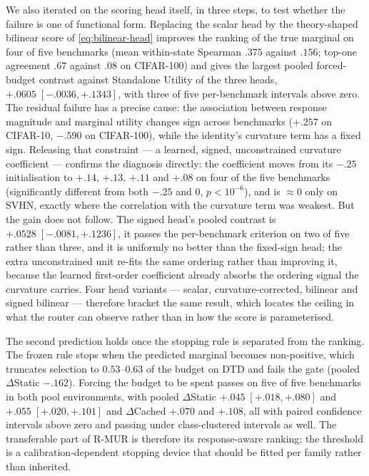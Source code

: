 We also iterated on the scoring head itself, in three steps, to test whether
the failure is one of functional form. Replacing the scalar head by the
theory-shaped bilinear score of \cref{eq:bilinear-head} improves the ranking of
the true marginal on four of five benchmarks (mean within-state Spearman $.375$
against $.156$; top-one agreement $.67$ against $.08$ on CIFAR-100) and gives
the largest pooled forced-budget contrast against Standalone Utility of the
three heads, $+.0605\;[-.0036,+.1343]$, with three of five per-benchmark
intervals above zero. The residual failure has a precise cause: the association
between response magnitude and marginal utility changes sign across benchmarks
($+.257$ on CIFAR-10, $-.590$ on CIFAR-100), while the identity's curvature term
has a fixed sign. Releasing that constraint --- a learned, signed, unconstrained
curvature coefficient --- confirms the diagnosis directly: the coefficient moves
from its $-.25$ initialisation to $+.14$, $+.13$, $+.11$ and $+.08$ on four of
the five benchmarks (significantly different from both $-.25$ and $0$,
$p<10^{-6}$), and is $\approx 0$ only on SVHN, exactly where the correlation
with the curvature term was weakest. But the gain does not follow. The signed
head's pooled contrast is $+.0528\;[-.0081,+.1236]$, it passes the
per-benchmark criterion on two of five rather than three, and it is uniformly no
better than the fixed-sign head; the extra unconstrained unit re-fits the same
ordering rather than improving it, because the learned first-order coefficient
already absorbs the ordering signal the curvature carries. Four head variants
--- scalar, curvature-corrected, bilinear and signed bilinear --- therefore
bracket the same result, which locates the ceiling in what the router can
observe rather than in how the score is parameterised.

The second prediction holds once the stopping rule is separated from the
ranking. The frozen rule stops when the predicted marginal becomes
non-positive, which truncates selection to $0.53$--$0.63$ of the budget on DTD
and fails the gate (pooled $\Delta$Static $-.162$). Forcing the budget to be
spent passes on five of five benchmarks in both pool environments, with pooled
$\Delta$Static $+.045\;[+.018,+.080]$ and $+.055\;[+.020,+.101]$ and
$\Delta$Cached $+.070$ and $+.108$, all with paired confidence intervals above
zero and passing under class-clustered intervals as well. The transferable part
of R-MUR is therefore its response-aware ranking; the threshold is a
calibration-dependent stopping device that should be fitted per family rather
than inherited.


